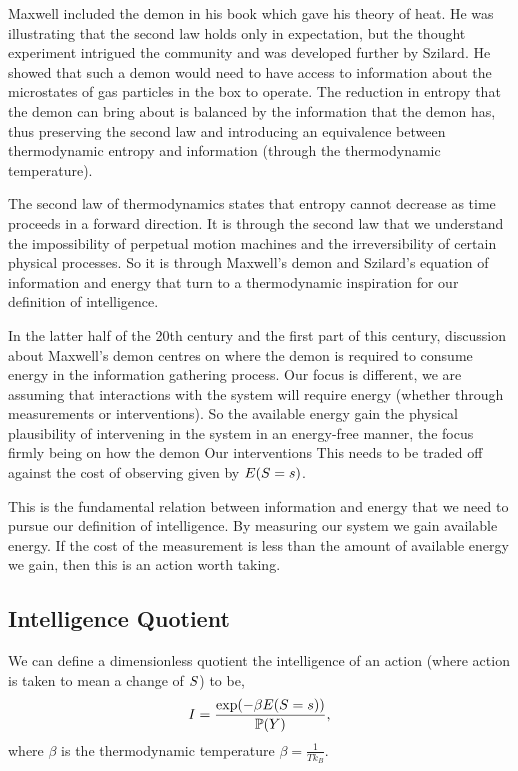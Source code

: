 \documentclass[]{article}
\begin{document}
Maxwell included the demon in his book which gave his theory of heat\citep{Maxwell-theory71}. He was illustrating that the second law holds only in expectation, but the thought experiment intrigued the community and was developed further by Szilard\citep{Szilard-intelligenter29}. He showed that such a demon would need to have access to information about the microstates of gas particles in the box to operate. The reduction in entropy that the demon can bring about is balanced by the information that the demon has, thus preserving the second law and introducing an equivalence between thermodynamic entropy and information (through the thermodynamic temperature).

The second law of thermodynamics states that entropy cannot decrease as time proceeds in a forward direction. It is through the second law that we understand the impossibility of perpetual motion machines and the irreversibility of certain physical processes. So it is through Maxwell's demon and Szilard's equation of information and energy that turn to a thermodynamic inspiration for our definition of intelligence.

In the latter half of the 20th century and the first part of this century, discussion about Maxwell's demon centres on where the demon is required to consume energy in the information gathering process. Our focus is different, we are assuming that interactions with the system will require energy (whether through measurements or interventions). So the available energy gain the physical plausibility of intervening in the system in an energy-free manner, the focus firmly being on how the demon Our interventions 
This needs to be traded off against the cost of
observing given by $E(S=s)$.

This is the fundamental relation between information and energy that
we need to pursue our definition of intelligence. By measuring our
system we gain available energy. If the cost of the measurement is
less than the amount of available energy we gain, then this is an
action worth taking.

\subsection{Intelligence Quotient}

We can define a dimensionless quotient the intelligence of an action
(where action is taken to mean a change of $S$) to
be,
\[
I = \frac{\exp(-\beta E(S=s))}{\mathbb{P}(Y)},\]
where $\beta$ is the thermodynamic temperature \(\beta = \frac{1}{Tk_B}\).
\end{document}
